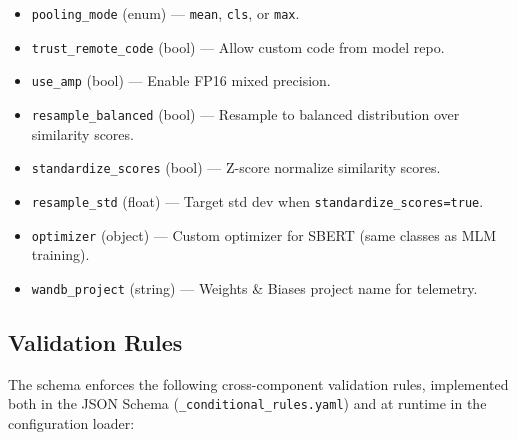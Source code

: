 \begin{itemize}[nosep]
    \item \texttt{pooling\_mode} (enum) --- \texttt{mean}, \texttt{cls}, or \texttt{max}.
    \item \texttt{trust\_remote\_code} (bool) --- Allow custom code from model repo.
    \item \texttt{use\_amp} (bool) --- Enable FP16 mixed precision.
    \item \texttt{resample\_balanced} (bool) --- Resample to balanced distribution over similarity scores.
    \item \texttt{standardize\_scores} (bool) --- Z-score normalize similarity scores.
    \item \texttt{resample\_std} (float) --- Target std dev when \texttt{standardize\_scores=true}.
    \item \texttt{optimizer} (object) --- Custom optimizer for SBERT (same classes as MLM training).
    \item \texttt{wandb\_project} (string) --- Weights \& Biases project name for telemetry.
\end{itemize}

\subsection{Validation Rules}

The schema enforces the following cross-component validation rules, implemented both in the JSON Schema (\texttt{\_conditional\_rules.yaml}) and at runtime in the configuration loader:

